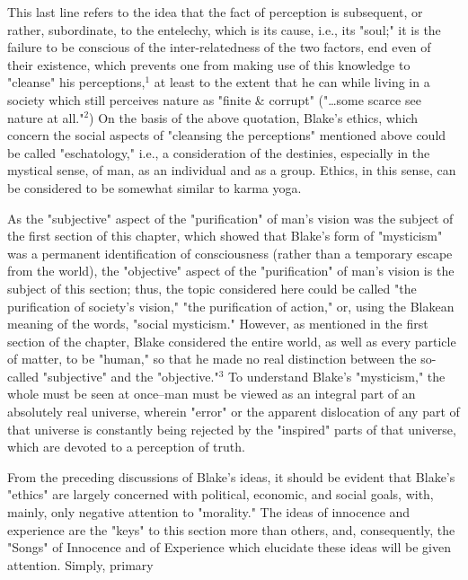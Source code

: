 This last line refers to the idea that the fact of perception is subsequent, or rather, subordinate, to the
entelechy, which is its cause, i.e., its "soul;" it is the failure to be conscious of the inter-relatedness of the two factors, end even
of their existence, which prevents one from making use of this knowledge to "cleanse" his perceptions,$^{1}$ at least
to the extent that he can while living in a society which still perceives nature as "finite \& corrupt" ("\dots some 
scarce see nature at all."$^{2}$) On the basis of the above quotation, Blake's ethics, which concern the social aspects of 
"cleansing the perceptions" mentioned above could be called "eschatology," i.e., a consideration of the destinies, especially in the
mystical sense, of man, as an individual and as a group. Ethics, in this sense, can be considered to be somewhat similar to karma yoga.\par
\vspace*{0.5\baselineskip}
As the "subjective" aspect of the "purification" of man's vision was the subject of the first section of this chapter, which showed that
Blake's form of "mysticism" was a permanent identification of consciousness (rather than a temporary escape from the world), the  "objective" aspect of
the "purification" of man's vision is the subject of this section; thus, the topic considered here could be called "the purification of society's vision," "the 
purification of action," or, using the Blakean meaning of the words, "social mysticism." However, as mentioned in the first section of the chapter, Blake considered the entire world,
as well as every particle of matter, to be "human," so that he made no real distinction between the so-called "subjective" and the "objective."$^{3}$ To understand Blake's
"mysticism," the whole must be seen at once--man must be viewed as an integral part of an absolutely real universe, wherein "error" or the apparent dislocation of any part of that
universe is constantly being rejected by the "inspired" parts of that universe, which are devoted to a perception of truth.\par
\vspace*{0.5\baselineskip}
From the preceding discussions of Blake's ideas, it should be evident that Blake's "ethics" are largely concerned with political,
economic, and social goals, with, mainly, only negative attention to "morality." The ideas of innocence and experience are the "keys"
to this section more than others, and, consequently, the "Songs" of Innocence and of Experience which elucidate these ideas will be given attention. Simply, primary
